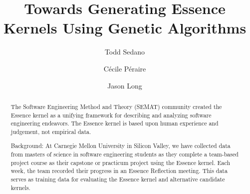 \documentclass[3p,times,procedia]{elsarticle}
\begin{document}
\begin{frontmatter}




\title{Towards Generating Essence Kernels Using Genetic Algorithms}

\author{Todd Sedano}

\author{C\'ecile P\'eraire}

\author{Jason Long}


\address{Carnegie Mellon University}
\address{Silicon Valley Campus}
\address{Moffett Field, CA 94035, USA}


\begin{abstract}
The Software Engineering Method and Theory (SEMAT) community created the Essence kernel as a unifying framework for describing and analyzing software engineering endeavors. The Essence kernel is based upon human experience and judgement, not empirical data. 

Background: At Carnegie Mellon University in Silicon Valley, we have collected data from masters of science in software engineering students as they complete a team-based project course as their capstone or practicum project using the Essence kernel. Each week, the team recorded their progress in an Essence Reflection meeting. This data serves as training data for evaluating the Essence kernel and alternative candidate kernels.


\end{abstract}
\end{frontmatter}
\end{document}
